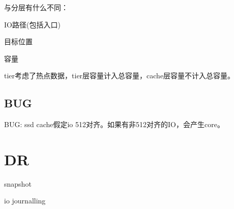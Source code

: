 与分层有什么不同：
\begin{compactitem}
\item IO路径(包括入口)
\item 目标位置
\item 容量
\end{compactitem}

tier考虑了热点数据，tier层容量计入总容量，cache层容量不计入总容量。

\subsection{BUG}

BUG: ssd cache假定io 512对齐。如果有非512对齐的IO，会产生core。
\section{DR}

snapshot

io journalling

